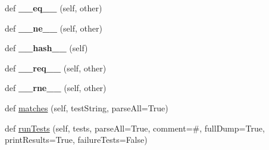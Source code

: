 \begin{DoxyCompactItemize}
\item 
\mbox{\label{classsetuptools_1_1__vendor_1_1pyparsing_1_1_parser_element_a5043f8497ee649455795186744db5300}} 
def {\bfseries \+\_\+\+\_\+eq\+\_\+\+\_\+} (self, other)
\item 
\mbox{\label{classsetuptools_1_1__vendor_1_1pyparsing_1_1_parser_element_adcacf5654535d8507e7bff8634e9a3c1}} 
def {\bfseries \+\_\+\+\_\+ne\+\_\+\+\_\+} (self, other)
\item 
\mbox{\label{classsetuptools_1_1__vendor_1_1pyparsing_1_1_parser_element_ac2c4dc9a984b1cf325b5325fbdb85e48}} 
def {\bfseries \+\_\+\+\_\+hash\+\_\+\+\_\+} (self)
\item 
\mbox{\label{classsetuptools_1_1__vendor_1_1pyparsing_1_1_parser_element_a10cccec6a7c5b2e8684ea1b6acdb2fe7}} 
def {\bfseries \+\_\+\+\_\+req\+\_\+\+\_\+} (self, other)
\item 
\mbox{\label{classsetuptools_1_1__vendor_1_1pyparsing_1_1_parser_element_a63c613d4d7dbb47e68e568b7fd9743f7}} 
def {\bfseries \+\_\+\+\_\+rne\+\_\+\+\_\+} (self, other)
\item 
def \hyperlink{classsetuptools_1_1__vendor_1_1pyparsing_1_1_parser_element_a2afc43378181105cbee5ab5dd4ed776f}{matches} (self, test\+String, parse\+All=True)
\item 
def \hyperlink{classsetuptools_1_1__vendor_1_1pyparsing_1_1_parser_element_ae01ef499653e57fa7cd9aa2d3fe5cd4c}{run\+Tests} (self, tests, parse\+All=True, comment=\textquotesingle{}\#\textquotesingle{}, full\+Dump=True, print\+Results=True, failure\+Tests=False)
\end{DoxyCompactItemize}
